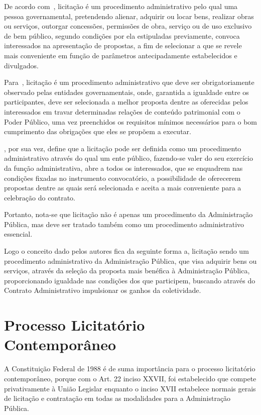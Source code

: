 De acordo com~\cite[p.519]{mello2009celso}, licitação é um procedimento administrativo pelo qual uma pessoa governamental, pretendendo alienar, adquirir ou locar bens, realizar obras ou serviços, outorgar concessões, permissões de obra, serviço ou de uso exclusivo de bem público, segundo condições por ela estipuladas previamente, convoca interessados na apresentação de propostas, a fim de selecionar a que se revele mais conveniente em função de parâmetros antecipadamente estabelecidos e divulgados.

Para~\cite[p.576]{alexandrino2008direito}, licitação é um procedimento administrativo que deve ser obrigatoriamente observado pelas entidades governamentais, onde, garantida a igualdade entre os participantes, deve ser selecionada a melhor proposta dentre as oferecidas pelos interessados em travar determinadas relações de conteúdo patrimonial com o Poder Público, uma vez preenchidos os requisitos mínimos necessários para o bom cumprimento das obrigações que eles se propõem a executar.

\cite[p.356]{di2006500}, por sua vez, define que a licitação pode ser definida como um procedimento administrativo através do qual um ente público, fazendo-se valer do seu exercício da função administrativa, abre a todos os interessados, que se enquadrem nas condições fixadas no instrumento convocatório, a possibilidade de oferecerem propostas dentre as quais será selecionada e aceita a mais conveniente para a celebração do contrato.

Portanto, nota-se que licitação não é apenas um procedimento da Administração Pública, mas deve ser tratado também como um procedimento administrativo essencial.

Logo o conceito dado pelos autores fica da seguinte forma a, licitação sendo um procedimento administrativo da Administração Pública, que visa adquirir bens ou serviços, através da seleção da proposta mais benéfica à Administração Pública, proporcionando igualdade nas condições dos que participem, buscando através do Contrato Administrativo impulsionar os ganhos da coletividade.

\section{Processo Licitatório Contemporâneo}

A Constituição Federal de 1988 é de suma importância para o processo licitatório contemporâneo, porque com o Art. 22 inciso XXVII, foi estabelecido que compete privativamente à União Legislar enquanto o inciso XVII estabelece normais gerais de licitação e contratação em todas as modalidades para a Administração Pública.

